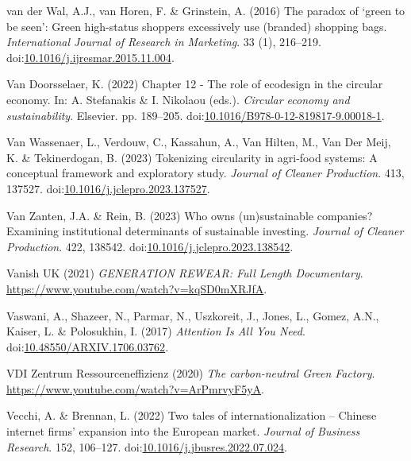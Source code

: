 \documentclass[
  letterpaper,
  DIV=11,
  numbers=noendperiod]{scrartcl}
\newlength{\cslhangindent}
\newenvironment{CSLReferences}[2] %
 {\begin{list}{}{%
  \setlength{\itemindent}{0pt}
  \setlength{\leftmargin}{0pt}
  \setlength{\parsep}{0pt}
  \ifodd #1
   \setlength{\leftmargin}{\cslhangindent}
   \setlength{\itemindent}{-1\cslhangindent}
  \fi
  \setlength{\itemsep}{#2\baselineskip}}}
 {\end{list}}
\begin{document}
\begin{CSLReferences}{0}{1}
van der Wal, A.J., van Horen, F. \& Grinstein, A. (2016) The paradox of
{`green to be seen'}: {Green} high-status shoppers excessively use
(branded) shopping bags. \emph{International Journal of Research in
Marketing}. 33 (1), 216--219.
doi:\href{https://doi.org/10.1016/j.ijresmar.2015.11.004}{10.1016/j.ijresmar.2015.11.004}.

Van Doorsselaer, K. (2022) Chapter 12 - {The} role of ecodesign in the
circular economy. In: A. Stefanakis \& I. Nikolaou (eds.).
\emph{Circular economy and sustainability}. Elsevier. pp. 189--205.
doi:\href{https://doi.org/10.1016/B978-0-12-819817-9.00018-1}{10.1016/B978-0-12-819817-9.00018-1}.

Van Wassenaer, L., Verdouw, C., Kassahun, A., Van Hilten, M., Van Der
Meij, K. \& Tekinerdogan, B. (2023) Tokenizing circularity in agri-food
systems: {A} conceptual framework and exploratory study. \emph{Journal
of Cleaner Production}. 413, 137527.
doi:\href{https://doi.org/10.1016/j.jclepro.2023.137527}{10.1016/j.jclepro.2023.137527}.

Van Zanten, J.A. \& Rein, B. (2023) Who owns (un)sustainable companies?
{Examining} institutional determinants of sustainable investing.
\emph{Journal of Cleaner Production}. 422, 138542.
doi:\href{https://doi.org/10.1016/j.jclepro.2023.138542}{10.1016/j.jclepro.2023.138542}.

Vanish UK (2021) \emph{{GENERATION REWEAR}: {Full Length Documentary}}.
\url{https://www.youtube.com/watch?v=kqSD0mXRJfA}.

Vaswani, A., Shazeer, N., Parmar, N., Uszkoreit, J., Jones, L., Gomez,
A.N., Kaiser, L. \& Polosukhin, I. (2017) \emph{Attention {Is All You
Need}}.
doi:\href{https://doi.org/10.48550/ARXIV.1706.03762}{10.48550/ARXIV.1706.03762}.

VDI Zentrum Ressourceneffizienz (2020) \emph{The carbon-neutral {Green
Factory}}. \url{https://www.youtube.com/watch?v=ArPmrvyF5yA}.

Vecchi, A. \& Brennan, L. (2022) Two tales of internationalization --
{Chinese} internet firms' expansion into the {European} market.
\emph{Journal of Business Research}. 152, 106--127.
doi:\href{https://doi.org/10.1016/j.jbusres.2022.07.024}{10.1016/j.jbusres.2022.07.024}.


\end{CSLReferences}
\end{document}
